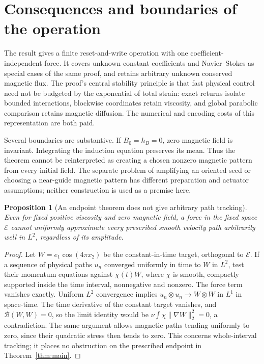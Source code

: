 \documentclass[11pt,a4paper]{amsart}
\newtheorem{proposition}[theorem]{Proposition}
\theoremstyle{definition}
\theoremstyle{remark}
\numberwithin{equation}{section}
\newcommand{\Bcal}{\mathcal B}
\newcommand{\Ecal}{\mathcal E}
\newcommand{\norm}[1]{\lVert #1\rVert}
\begin{document}
\section{Consequences and boundaries of the operation}\label{sec:discussion}
The result gives a finite reset-and-write operation with one coefficient-independent force. It covers unknown constant coefficients and Navier--Stokes as special cases of the same proof, and retains arbitrary unknown conserved magnetic flux. The proof's central stability principle is that fast physical control need not be budgeted by the exponential of total strain: exact returns isolate bounded interactions, blockwise coordinates retain viscosity, and global parabolic comparison retains magnetic diffusion. The numerical and encoding costs of this representation are both paid.

Several boundaries are substantive. If $B_0=h_B=0$, zero magnetic field is invariant. Integrating the induction equation preserves its mean. Thus the theorem cannot be reinterpreted as creating a chosen nonzero magnetic pattern from every initial field. The separate problem of amplifying an oriented seed or choosing a near-guide magnetic pattern has different preparation and actuator assumptions; neither construction is used as a premise here.

\begin{proposition}[An endpoint theorem does not give arbitrary path tracking]\label{prop:tracking}
Even for fixed positive viscosity and zero magnetic field, a force in the fixed space $\Ecal$ cannot uniformly approximate every prescribed smooth velocity path arbitrarily well in $L^2$, regardless of its amplitude.
\end{proposition}
\begin{proof}
Let $W=e_1\cos(4\pi x_2)$ be the constant-in-time target, orthogonal to $\Ecal$. If a sequence of physical paths $u_n$ converged uniformly in time to $W$ in $L^2$, test their momentum equations against $\chi(t)W$, where $\chi$ is smooth, compactly supported inside the time interval, nonnegative and nonzero. The force term vanishes exactly. Uniform $L^2$ convergence implies $u_n\otimes u_n\to W\otimes W$ in $L^1$ in space-time. The time derivative of the constant target vanishes, and $\Bcal(W,W)=0$, so the limit identity would be
$\nu\int\chi\norm{\nabla W}_2^2=0$, a contradiction. The same argument allows magnetic paths tending uniformly to zero, since their quadratic stress then tends to zero. This concerns whole-interval tracking; it places no obstruction on the prescribed endpoint in Theorem~\ref{thm:main}.
\end{proof}
\end{document}
